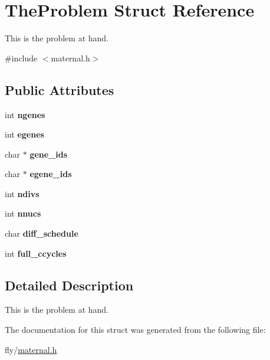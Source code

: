 \hypertarget{structTheProblem}{
\section{TheProblem Struct Reference}
\label{structTheProblem}
}


This is the problem at hand.  


{\ttfamily \#include $<$maternal.h$>$}\subsection*{Public Attributes}
\begin{DoxyCompactItemize}
\item 
\hypertarget{structTheProblem_a4ef58beb5d2874f2e93b05485c0c4403}{
int {\bfseries ngenes}}
\label{structTheProblem_a4ef58beb5d2874f2e93b05485c0c4403}

\item 
\hypertarget{structTheProblem_ac7c5e3d1af67035c245101fc725700e8}{
int {\bfseries egenes}}
\label{structTheProblem_ac7c5e3d1af67035c245101fc725700e8}

\item 
\hypertarget{structTheProblem_a2750ce12d42aa468dd6f6653ac5cef12}{
char $\ast$ {\bfseries gene\_\-ids}}
\label{structTheProblem_a2750ce12d42aa468dd6f6653ac5cef12}

\item 
\hypertarget{structTheProblem_a21f32bf9db9f1f3c8e3efe41c53c408a}{
char $\ast$ {\bfseries egene\_\-ids}}
\label{structTheProblem_a21f32bf9db9f1f3c8e3efe41c53c408a}

\item 
\hypertarget{structTheProblem_a17407bb5f5fb8aafb5c771526800c7ea}{
int {\bfseries ndivs}}
\label{structTheProblem_a17407bb5f5fb8aafb5c771526800c7ea}

\item 
\hypertarget{structTheProblem_a3dad67bfce5a51677f6310590f304ae6}{
int {\bfseries nnucs}}
\label{structTheProblem_a3dad67bfce5a51677f6310590f304ae6}

\item 
\hypertarget{structTheProblem_a1a9e0947443ed5758425be1d43e0bf9b}{
char {\bfseries diff\_\-schedule}}
\label{structTheProblem_a1a9e0947443ed5758425be1d43e0bf9b}

\item 
\hypertarget{structTheProblem_a2376b63f4dbc1830475bb1c97165a254}{
int {\bfseries full\_\-ccycles}}
\label{structTheProblem_a2376b63f4dbc1830475bb1c97165a254}

\end{DoxyCompactItemize}


\subsection{Detailed Description}
This is the problem at hand. 

The documentation for this struct was generated from the following file:\begin{DoxyCompactItemize}
\item 
fly/\hyperlink{maternal_8h}{maternal.h}\end{DoxyCompactItemize}
